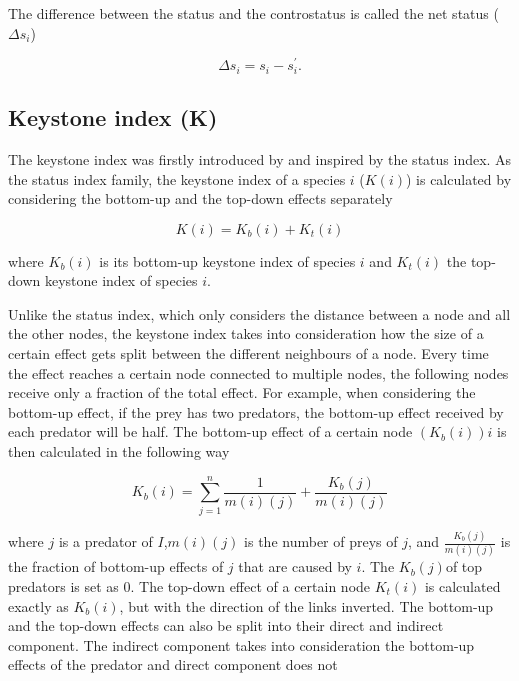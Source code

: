 \documentclass[twocolumn]{article}
\begin{document}
		The difference between the status and the controstatus is called the net status ($\Delta s_i$)

						\begin{equation}
							\Delta s_i=s_i-s_i^\prime.
						\end{equation}

	\subsection*{Keystone index (K)}

		The keystone index was firstly introduced by \citet{Jordan1999} and inspired by the status index. As the status index family, the keystone index of a species $i$ ($K(i)$) is calculated by considering the bottom-up and the top-down effects separately \citet{Jordan2006}

						\begin{equation}
							K\left(i\right)=K_b\left(i\right)+K_t\left(i\right)
						\end{equation}

		\noindent where $K_b\left(i\right)$ is its bottom-up keystone index of species $i$ and $K_t\left(i\right)$ the top-down keystone index of species $i$.

		Unlike the status index, which only considers the distance between a node and all the other nodes, the keystone index takes into consideration how the size of a certain effect gets split between the different neighbours of a node. Every time the effect reaches a certain node connected to multiple nodes, the following nodes receive only a fraction of the total effect. For example, when considering the bottom-up effect, if the prey has two predators, the bottom-up effect received by each predator will be half. The bottom-up effect of a certain node $(K_b\left(i\right))i$ is then calculated in the following way

						\begin{equation}
							K_b\left(i\right)=\sum_{j=1}^{n}\frac{1}{m\left(i\right)\left(j\right)}+\frac{K_b\left(j\right)}{m\left(i\right)\left(j\right)}
						\end{equation}

		\noindent where $j$ is a predator of $I$,$m(i)(j)$ is the number of preys of $j$, and $\frac{K_b\left(j\right)}{m\left(i\right)\left(j\right)}$ is the fraction of bottom-up effects of $j$ that are caused by $i$. The $K_b\left(j\right)$of top predators is set as 0. The top-down effect of a certain node $K_t\left(i\right)$ is calculated exactly as $K_b\left(i\right)$, but with the direction of the links inverted. The bottom-up and the top-down effects can also be split into their direct and indirect component. The indirect component takes into consideration the bottom-up effects of the predator and direct component does not
\end{document}

